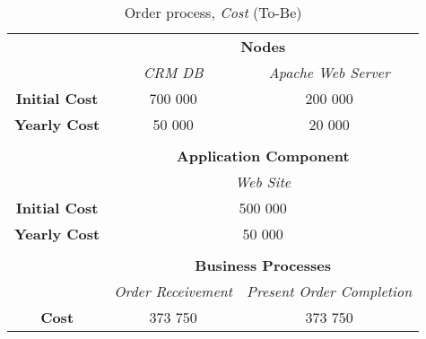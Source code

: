 \begin{table}[H]
	\centering
	\begin{tabular}{|c|c|p{2cm}|p{2.5cm}|p{2.5cm}|p{2.5cm}|}
		\cline{3-6}

		\multicolumn{2}{c}{} & \multicolumn{4}{|c|}{\textbf{Nodes}} \\ \cline{3-6}
		\multicolumn{2}{c|}{} & \multicolumn{2}{c|}{\textsl{CRM DB}} & \multicolumn{2}{c|}{\textsl{Apache Web Server}} \\
		\hline
		\multicolumn{2}{|c|}{\textbf{Initial Cost}} & \multicolumn{2}{c|}{700 000} & \multicolumn{2}{c|}{200 000} \\ \hline
		\multicolumn{2}{|c|}{\textbf{Yearly Cost}}  & \multicolumn{2}{c|}{50 000} & \multicolumn{2}{c|}{20 000} \\ \hline
		
		\multicolumn{6}{c}{} \\ \cline{3-6}
		\multicolumn{2}{c}{} & \multicolumn{4}{|c|}{\textbf{Application Component}} \\ \cline{3-6}
		\multicolumn{2}{c|}{} & \multicolumn{4}{c|}{\textsl{Web Site}} \\
		\hline
		\multicolumn{2}{|c|}{\textbf{Initial Cost}} & \multicolumn{4}{c|}{500 000}  \\ \hline
		\multicolumn{2}{|c|}{\textbf{Yearly Cost}}  & \multicolumn{4}{c|}{50 000}  \\ \hline

		\multicolumn{6}{c}{} \\ \cline{3-6}
		\multicolumn{2}{c}{} & \multicolumn{4}{|c|}{\textbf{Business Processes}} \\ \cline{3-6}
		\multicolumn{2}{c|}{} & \multicolumn{2}{c|}{\textsl{Order Receivement}} & \multicolumn{2}{c|}{\textsl{Present Order Completion}} \\
		\hline
		\multicolumn{2}{|c|}{\textbf{Cost}} & \multicolumn{2}{c|}{373 750} & \multicolumn{2}{c|}{373 750} \\ \hline
	\end{tabular}
\caption{Order process, \textsl{Cost} (To-Be)} 
\label{tab:order_to_be}
\end{table}